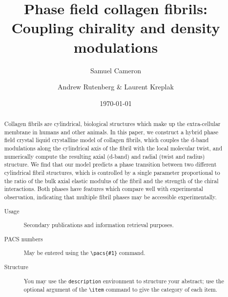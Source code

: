 \documentclass[%
 reprint,
 amsmath,amssymb,
 aps,
]{revtex4-1}
\begin{document}

\title{Phase field collagen fibrils: Coupling chirality and density modulations}%

\author{Samuel Cameron}%
%


\author{Andrew Rutenberg \& Laurent Kreplak}
%
%
\author{}
%


\date{\today}%

\begin{abstract}
Collagen fibrils are cylindrical, biological structures which make up the extra-cellular membrane in humans and other animals. In this paper, we construct a hybrid phase field crystal liquid crystalline model of collagen fibrils, which couples the d-band modulations along the cylindrical axis of the fibril with the local molecular twist, and numerically compute the resulting axial (d-band) and radial (twist and radius) structure. We find that our model predicts a phase transition between two different cylindrical fibril structures, which is controlled by a single parameter proportional to the ratio of the bulk axial elastic modulus of the fibril and the strength of the chiral interactions. Both phases have features which compare well with experimental observation, indicating that multiple fibril phases may be accessible experimentally.
\begin{description}
\item[Usage]
Secondary publications and information retrieval purposes.
\item[PACS numbers]
May be entered using the \verb+\pacs{#1}+ command.
\item[Structure]
You may use the \texttt{description} environment to structure your abstract;
use the optional argument of the \verb+\item+ command to give the category of each item. 
\end{description}
\end{abstract}
\end{document}
